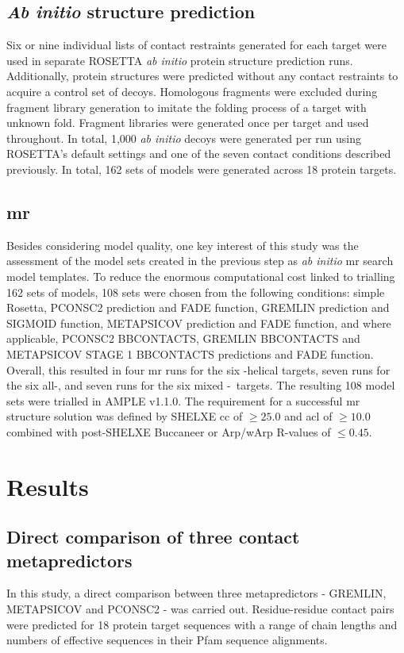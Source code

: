 \subsection{\textit{Ab initio} structure prediction}
Six or nine individual lists of contact restraints generated for each target were used in separate ROSETTA \textit{ab initio} protein structure prediction runs. Additionally, protein structures were predicted without any contact restraints to acquire a control set of decoys. Homologous fragments were excluded during fragment library generation to imitate the folding process of a target with unknown fold. Fragment libraries were generated once per target and used throughout. In total, 1,000 \textit{ab initio} decoys were generated per run using ROSETTA’s default settings \cite{Rohl2004-ou} and one of the seven contact conditions described previously. In total, 162 sets of models were generated across 18 protein targets.

\subsection{\acrlong{mr}}
Besides considering model quality, one key interest of this study was the assessment of the model sets created in the previous step as \textit{ab initio} \gls{mr} search model templates. To reduce the enormous computational cost linked to trialling 162 sets of models, 108 sets were chosen from the following conditions: simple Rosetta, PCONSC2 prediction and FADE function, GREMLIN prediction and SIGMOID function, METAPSICOV prediction and FADE function, and where applicable, PCONSC2 BBCONTACTS, GREMLIN BBCONTACTS and METAPSICOV STAGE 1 BBCONTACTS predictions and FADE function. Overall, this resulted in four \gls{mr} runs for the six \textalpha-helical targets, seven runs for the six all-\textbeta, and seven runs for the six mixed \textalpha-\textbeta\ targets. The resulting 108 model sets were trialled in AMPLE v1.1.0. The requirement for a successful \gls{mr} structure solution was defined by SHELXE \gls{cc} of $\geq25.0$ and \gls{acl} of $\geq10.0$ combined with post-SHELXE Buccaneer \cite{} or Arp/wArp \cite{} R-values of $\leq0.45$.

\section{Results}
\subsection{Direct comparison of three contact metapredictors}
In this study, a direct comparison between three metapredictors - GREMLIN, METAPSICOV and PCONSC2 - was carried out. Residue-residue contact pairs were predicted for 18 protein target sequences with a range of chain lengths and numbers of effective sequences in their Pfam sequence alignments.

